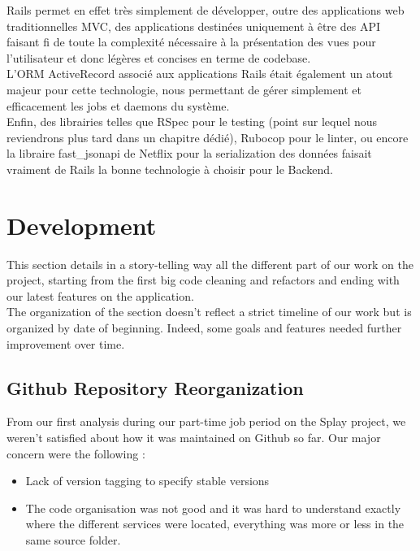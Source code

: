 \documentclass{eplmastersthesis}
\begin{document}
        Rails permet en effet très simplement de développer, outre des
        applications web traditionnelles MVC, des applications destinées uniquement
        à être des API faisant fi de toute la complexité nécessaire à la
        présentation des vues pour l'utilisateur et donc légères et concises
        en terme de codebase.\\
        L'ORM ActiveRecord associé aux applications Rails était également un
        atout majeur pour cette technologie, nous permettant de gérer
        simplement et efficacement les jobs et daemons du système.\\
        Enfin, des librairies telles que RSpec pour le testing (point sur
        lequel nous reviendrons plus tard dans un chapitre dédié), Rubocop pour
        le linter, ou encore la libraire fast\_jsonapi de Netflix pour la
        serialization des données faisait vraiment de Rails la bonne technologie
        à choisir pour le Backend.

    \section{Development}

      This section details in a story-telling way all the different part
      of our work on the project, starting from the first big code cleaning
      and refactors and ending with our latest features on the application.\\

      The organization of the section doesn't reflect a strict timeline of
      our work but is organized by date of beginning. Indeed, some goals
      and features needed further improvement over time.

      \subsection{Github Repository Reorganization}

        From our first analysis during our part-time job period on the Splay
        project, we weren't satisfied about how it was maintained on Github so
        far. Our major concern were the following :

        \begin{itemize}
          \item Lack of version tagging to specify stable versions
          \item The code organisation was not good and it was hard to
          understand exactly where the different services were located,
          everything was more or less in the same source folder.
        \end{itemize}
\end{document}
